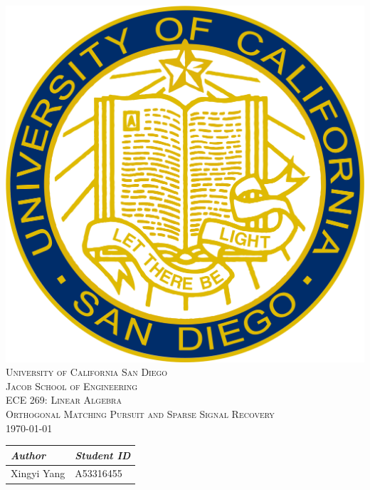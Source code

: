 \documentclass{ucsdreport}
\def\course{ECE 269: Linear Algebra}                                        %
\def\thetitle{Orthogonal Matching Pursuit and Sparse Signal Recovery}       %
\def\date{\today}                                                           %
\begin{document}
\providecommand{\keywords}[1]{\textbf{\textit{Keywords---}} #1}
\theoremstyle{definition}
\newtheorem{definition}{Definition}[section]
\DeclarePairedDelimiter{\nint}\lfloor\rceil
\begin{center}
    \vspace*{1.5cm}
    \includegraphics[scale = 0.10]{UCSDseal.png}\\[1.75cm]
    \textsc{\color[RGB]{0, 51, 102}\LARGE{University of California San Diego}}\\[.5cm]
    \textsc{Jacob School of Engineering}\\[1cm]
    \textsc{\Large{\course}}\\[.5cm]
    \textsc{\Large{\thetitle}}\\[.5cm]
    \textsc{\date}\\[2cm]
    \Large{
    \begin{tabular}{L{4cm} R{4cm}}
        \textit{Author} &  \textit{Student ID}\\
        \hline
        Xingyi Yang & A53316455\\
    \end{tabular}
    }
\end{center}
\thispagestyle{empty}
\pagebreak

\tableofcontents{}
\pagebreak
\end{document}
